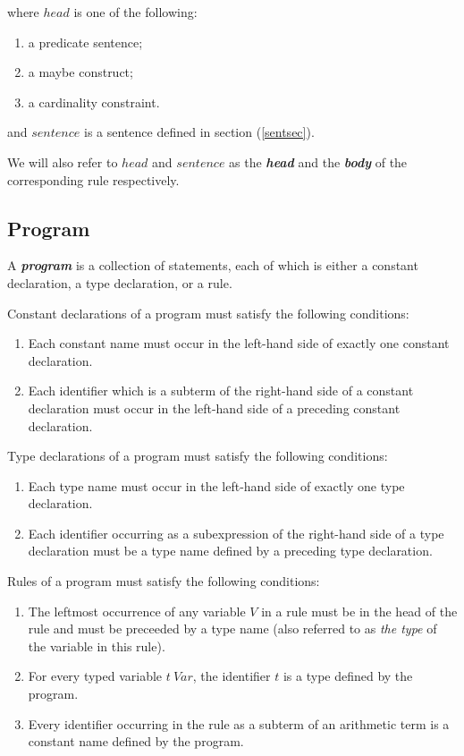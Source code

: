 \documentclass[a4paper,10pt]{article}
\begin{document}
\noindent
where $head$ is one of the following:
\begin{enumerate}
\item  a predicate sentence;
\item  a maybe construct;
\item  a cardinality constraint.
\end{enumerate}

\noindent
and $sentence$ is a sentence defined in section (\ref{sentsec}).

We will also refer to $head$ and $sentence$ as the \textit{\textbf{head}} and the \textit{\textbf{body}} of the corresponding rule respectively.
 
\subsection{Program} \label{progdef}
A \textbf{\textit{program}} is a collection of statements, each of which is either a constant declaration, a
 type declaration, or a rule.

\noindent\vspace{0.2cm}

Constant declarations of a program must satisfy the following conditions:
\begin{enumerate}
\item Each constant name must occur in the left-hand side of exactly one constant declaration.
\item Each identifier which is a subterm of the right-hand side of a constant declaration must occur in the left-hand side of a preceding constant declaration.   

\end{enumerate}



Type declarations of a program must satisfy the following conditions:
\begin{enumerate}
\item Each type name must occur in the left-hand side of exactly one type declaration.
\item Each identifier occurring as  a subexpression of the right-hand side of a  type declaration must be a type name defined by a preceding type declaration. 
\end{enumerate}


Rules of a program must satisfy the following conditions:

\begin{enumerate}


\item The leftmost occurrence of any variable  $V$ in a rule must be in the head of the rule and must be preceeded by a type name (also referred to as \textit{the type} of the variable in this rule).

\item For every typed variable $t~Var$, the identifier $t$ is a type defined by the program.
\item Every identifier  occurring in the rule as a subterm of an arithmetic term is a constant name defined by the program.
\end{enumerate}
\end{document}

